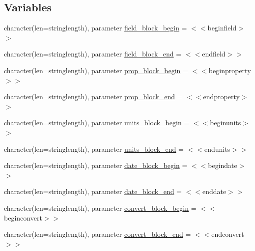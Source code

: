 \subsection*{Variables}
\begin{DoxyCompactItemize}
\item 
character(len=stringlength), parameter \mbox{\hyperlink{namespacemodulegfsasciiwind_a2c0745dc6b808be5890234478059c603}{field\+\_\+block\+\_\+begin}} = \textquotesingle{}$<$$<$beginfield$>$$>$\textquotesingle{}
\item 
character(len=stringlength), parameter \mbox{\hyperlink{namespacemodulegfsasciiwind_ae8d1dc361028c3693336bb732fc2a502}{field\+\_\+block\+\_\+end}} = \textquotesingle{}$<$$<$endfield$>$$>$\textquotesingle{}
\item 
character(len=stringlength), parameter \mbox{\hyperlink{namespacemodulegfsasciiwind_a036d03f90ca62e80e383e0817e415089}{prop\+\_\+block\+\_\+begin}} = \textquotesingle{}$<$$<$beginproperty$>$$>$\textquotesingle{}
\item 
character(len=stringlength), parameter \mbox{\hyperlink{namespacemodulegfsasciiwind_a239295586e75d8d91ccab74434e29581}{prop\+\_\+block\+\_\+end}} = \textquotesingle{}$<$$<$endproperty$>$$>$\textquotesingle{}
\item 
character(len=stringlength), parameter \mbox{\hyperlink{namespacemodulegfsasciiwind_af4903f24bfb8c26bad841c76f24ffc97}{units\+\_\+block\+\_\+begin}} = \textquotesingle{}$<$$<$beginunits$>$$>$\textquotesingle{}
\item 
character(len=stringlength), parameter \mbox{\hyperlink{namespacemodulegfsasciiwind_ab88fa85792b55aff45b9916708cf12ae}{units\+\_\+block\+\_\+end}} = \textquotesingle{}$<$$<$endunits$>$$>$\textquotesingle{}
\item 
character(len=stringlength), parameter \mbox{\hyperlink{namespacemodulegfsasciiwind_a0f313fac62779d173ef39b9aeaf5ee0d}{date\+\_\+block\+\_\+begin}} = \textquotesingle{}$<$$<$begindate$>$$>$\textquotesingle{}
\item 
character(len=stringlength), parameter \mbox{\hyperlink{namespacemodulegfsasciiwind_a7d76704d4672bd7af3a050e4dae08735}{date\+\_\+block\+\_\+end}} = \textquotesingle{}$<$$<$enddate$>$$>$\textquotesingle{}
\item 
character(len=stringlength), parameter \mbox{\hyperlink{namespacemodulegfsasciiwind_a2fdc105a5e66cf54be832babc014ca26}{convert\+\_\+block\+\_\+begin}} = \textquotesingle{}$<$$<$beginconvert$>$$>$\textquotesingle{}
\item 
character(len=stringlength), parameter \mbox{\hyperlink{namespacemodulegfsasciiwind_aaa6e5d0628451ecaf95e028d77e17e74}{convert\+\_\+block\+\_\+end}} = \textquotesingle{}$<$$<$endconvert$>$$>$\textquotesingle{}

\end{DoxyCompactItemize}
